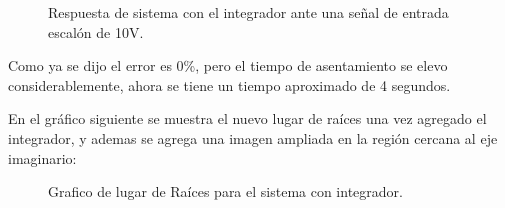 \documentclass[a4paper,11pt]{article}
\begin{document}
  \begin{figure}[H] %
	\caption{Respuesta de sistema con el integrador ante una señal de entrada escalón de 10V.}
	\label{fig:FTlazoc_poloenorig_step}
	\end{figure} 

Como ya se dijo el error es 0\%, pero el tiempo de asentamiento se elevo considerablemente, ahora se tiene un tiempo aproximado de 4 segundos.

En el gráfico siguiente se muestra el nuevo lugar de raíces una vez agregado el integrador, y ademas se agrega una imagen ampliada en la región cercana al eje imaginario:\\

  \begin{figure}[H] %
	\caption{Grafico de lugar de Raíces para el sistema con integrador.}
	\label{fig:FTlazoc_poloenorig_rlocus}
	\end{figure} 
\end{document}
